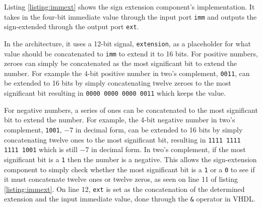 \documentclass[11pt]{report}
\begin{document}

Listing \ref{listing:immext} shows the sign extension component's implementation. It takes in the
four-bit immediate value through the input port \verb|imm| and outputs the sign-extended through the
output port \verb|ext|.

In the architecture, it uses a 12-bit signal, \verb|extension|, as a placeholder for what value
should be concatenated to \verb|imm| to extend it to 16 bits. For positive numbers, zeroes can
simply be concatenated as the most significant bit to extend the number. For example the 4-bit
positive number in two's complement, \verb|0011|, can be extended to 16 bits by simply concatenating
twelve zeroes to the most significant bit resulting in \verb|0000 0000 0000 0011| which keeps the
value.

For negative numbers, a series of ones can be concatenated to the most significant bit to extend the
number. For example, the 4-bit negative number in two's complement, \verb|1001|, $-7$ in decimal
form, can be extended to 16 bits by simply concatenating twelve ones to the most significant bit,
resulting in \verb|1111 1111 1111 1001| which is still $-7$ in decimal form. In two's complement, if
the most significant bit is a \verb|1| then the number is a negative. This allows the sign-extension
component to simply check whether the most significant bit is a \verb|1| or a \verb|0| to see if it
must concatenate twelve ones or twelve zeros, as seen on line 11 of listing \ref{listing:immext}. On
line 12, \verb|ext| is set as the concatenation of the determined extension and the input immediate
value, done through the \verb|&| operator in VHDL.

\newpage

\end{document}
